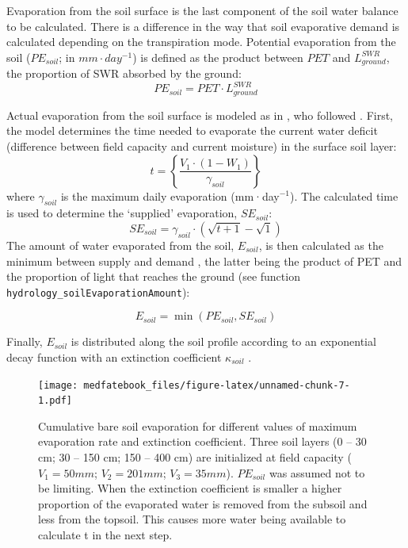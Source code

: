 \documentclass[]{book}
\begin{document}
Evaporation from the soil surface is the last component of the soil water balance to be calculated. There is a difference in the way that soil evaporative demand is calculated depending on the transpiration mode. Potential evaporation from the soil (\(PE_{soil}\); in \(mm\cdot day^{-1}\)) is defined as the product between \(PET\) and \(L^{SWR}_{ground}\), the proportion of SWR absorbed by the ground:
\begin{equation}
PE_{soil} =  PET\cdot L^{SWR}_{ground}
\end{equation}

Actual evaporation from the soil surface is modeled as in \citet{Mouillot2001}, who
followed \citet{Ritchie1972}. First, the model determines the time needed to evaporate
the current water deficit (difference between field capacity and current moisture)
in the surface soil layer:
\begin{equation}
t = \left \{ \frac{V_1\cdot(1- W_1)}{\gamma_{soil}} \right \}
\end{equation}
where \(\gamma_{soil}\) is the maximum daily evaporation (mm·day\(^{-1}\)). The
calculated time is used to determine the `supplied' evaporation, \(SE_{soil}\):
\begin{equation}
SE_{soil} = \gamma_{soil} \cdot (\sqrt{t+1}-\sqrt{1})
\end{equation}
The amount of water evaporated from the soil, \(E_{soil}\), is then calculated as
the minimum between supply and demand \citep{Federer1982}, the latter being the product
of PET and the proportion of light that reaches the ground (see function \texttt{hydrology\_soilEvaporationAmount}):

\begin{equation}
E_{soil} = \min(PE_{soil}, SE_{soil})
\end{equation}

Finally, \(E_{soil}\) is distributed along the soil profile according to an exponential decay function with an extinction coefficient \(\kappa_{soil}\) \citep{Mouillot2001}.

\begin{figure}
\centering
\texttt{[image: medfatebook\_files/figure-latex/unnamed-chunk-7-1.pdf]}
\caption{\label{fig:unnamed-chunk-7}Cumulative bare soil evaporation for different values of maximum evaporation rate and extinction coefficient. Three soil layers (0 -- 30 cm; 30 -- 150 cm; 150 -- 400 cm) are initialized at field capacity (\(V_1 = 50 mm\); \(V_2 = 201 mm\); \(V_3 = 35 mm\)). \(PE_{soil}\) was assumed not to be limiting. When the extinction coefficient is smaller a higher proportion of the evaporated water is removed from the subsoil and less from the topsoil. This causes more water being available to calculate t in the next step.}
\end{figure}
\end{document}
